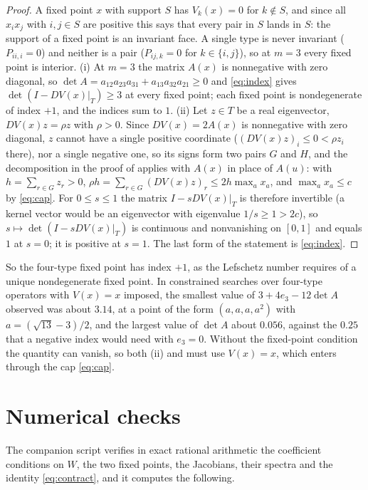 \documentclass[11pt]{amsart}
\theoremstyle{definition}
\begin{document}
\begin{proof}
A fixed point $x$ with support $S$ has $V_k(x)=0$ for $k\notin S$, and since all $x_ix_j$ with $i,j\in S$ are positive this says that every pair in $S$ lands in $S$: the support of a fixed point is an invariant face. A single type is never invariant ($P_{ii,i}=0$) and neither is a pair ($P_{ij,k}=0$ for $k\in\{i,j\}$), so at $m=3$ every fixed point is interior. (i) At $m=3$ the matrix $A(x)$ is nonnegative with zero diagonal, so $\det A=a_{12}a_{23}a_{31}+a_{13}a_{32}a_{21}\ge0$ and \eqref{eq:index} gives $\det(I-DV(x)|_T)\ge3$ at every fixed point; each fixed point is nondegenerate of index $+1$, and the indices sum to $1$. (ii) Let $z\in T$ be a real eigenvector, $DV(x)z=\rho z$ with $\rho>0$. Since $DV(x)=2A(x)$ is nonnegative with zero diagonal, $z$ cannot have a single positive coordinate ($(DV(x)z)_i\le0<\rho z_i$ there), nor a single negative one, so its signs form two pairs $G$ and $H$, and the decomposition in the proof of  applies with $A(x)$ in place of $A(u)$: with $h=\sum_{r\in G}z_r>0$, $\rho h=\sum_{r\in G}(DV(x)z)_r\le2h\max_ax_a$, and $\max_ax_a\le c$ by \eqref{eq:cap}. For $0\le s\le1$ the matrix $I-sDV(x)|_T$ is therefore invertible (a kernel vector would be an eigenvector with eigenvalue $1/s\ge1>2c$), so $s\mapsto\det(I-sDV(x)|_T)$ is continuous and nonvanishing on $[0,1]$ and equals $1$ at $s=0$; it is positive at $s=1$. The last form of the statement is \eqref{eq:index}.
\end{proof}

So the four-type fixed point has index $+1$, as the Lefschetz number requires of a unique nondegenerate fixed point. In constrained searches over four-type operators with $V(x)=x$ imposed, the smallest value of $3+4e_3-12\det A$ observed was about $3.14$, at a point of the form $(a,a,a,a^2)$ with $a=(\sqrt{13}-3)/2$, and the largest value of $\det A$ about $0.056$, against the $0.25$ that a negative index would need with $e_3=0$. Without the fixed-point condition the quantity can vanish, so both (ii) and  must use $V(x)=x$, which enters through the cap \eqref{eq:cap}.

\section{Numerical checks}\label{sec:numerics}

The companion script verifies in exact rational arithmetic the coefficient conditions on $W$, the two fixed points, the Jacobians, their spectra and the identity \eqref{eq:contract}, and it computes the following.
\end{document}
